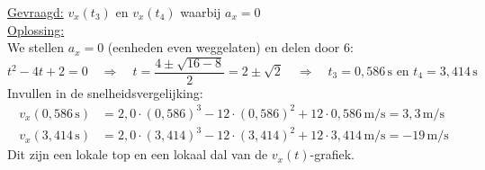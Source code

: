 \documentclass{ximera}
\begin{document}
\begin{exercise}
\begin{question}
\begin{solution}
            \underline{Gevraagd:} $v_x(t_3)$ en $v_x(t_4)$ waarbij $a_x = 0$\\

            \underline{Oplossing:}\\
            We stellen $a_x = 0$ (eenheden even weggelaten) en delen door $6$:
            \[
                t^{2} - 4t + 2 = 0 \quad \Rightarrow \quad t = \frac{4 \pm \sqrt{16 - 8}}{2} = 2 \pm \sqrt{2} \quad \Rightarrow \quad t_3 = 0{,}586 \, \mathrm{s} \text{ en } t_4 = 3{,}414 \, \mathrm{s}
            \]
            Invullen in de snelheidsvergelijking:
            \begin{align*}
                v_x(0{,}586 \, \mathrm{s}) &= 2{,}0 \cdot (0{,}586)^{3} - 12 \cdot (0{,}586)^{2} + 12 \cdot 0{,}586 \, \mathrm{m/s} = \boxed{3{,}3 \, \mathrm{m/s}}\\
                v_x(3{,}414 \, \mathrm{s}) &= 2{,}0 \cdot (3{,}414)^{3} - 12 \cdot (3{,}414)^{2} + 12 \cdot 3{,}414 \, \mathrm{m/s} = \boxed{-19 \, \mathrm{m/s}}
            \end{align*}
            Dit zijn een lokale top en een lokaal dal van de $v_x(t)$-grafiek.
        \end{solution}
    \end{question}
\end{exercise}
\end{document}
